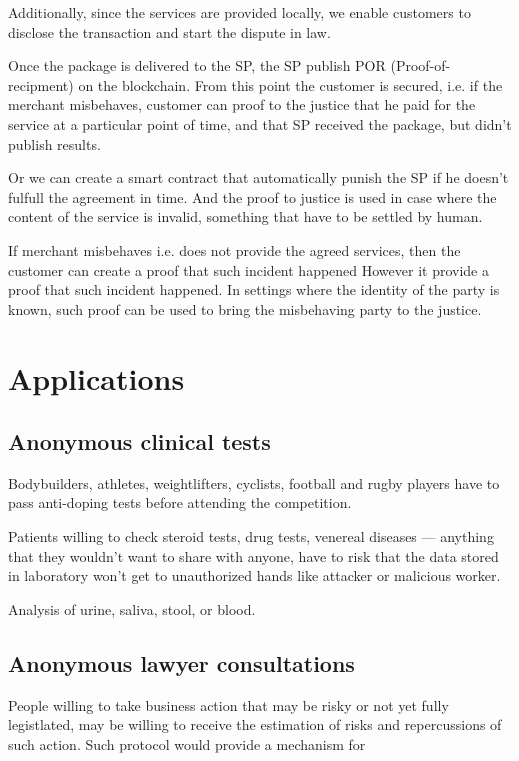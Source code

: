 \documentclass{article}
\begin{document}
Additionally, since the services are provided locally, we enable customers to disclose the transaction and start the dispute in law.

Once the package is delivered to the SP, the SP publish POR (Proof-of-recipment) on the blockchain. From this point the customer is secured, i.e. if the merchant misbehaves, customer can proof to the justice that he paid for the service at a particular point of time, and that SP received the package, but didn't publish results. 


Or we can create a smart contract that automatically punish the SP if he doesn't fulfull the agreement in time. And the proof to justice is used in case where the content of the service is invalid, something that have to be settled by human.

If merchant misbehaves i.e. does not provide the agreed services, then the customer can create a proof that such incident happened 
However it provide a proof that such incident happened. In settings where the identity of the party is known, such proof can be used to bring the misbehaving party to the justice.


\section{Applications}
\subsection{Anonymous clinical tests}
Bodybuilders, athletes,  weightlifters, cyclists, football and rugby players have to pass anti-doping tests before attending the competition. 

Patients willing to check steroid tests, drug tests, venereal diseases — anything that they wouldn't want to share with anyone, have to risk that the data stored in laboratory won't get to unauthorized hands like attacker or malicious worker.

Analysis of urine, saliva, stool, or blood. 

\subsection{Anonymous lawyer consultations}

People willing to take business action that may be risky or not yet fully legistlated, may be willing to receive the estimation of risks and repercussions of such action.
Such protocol would provide a mechanism for 
\end{document}

